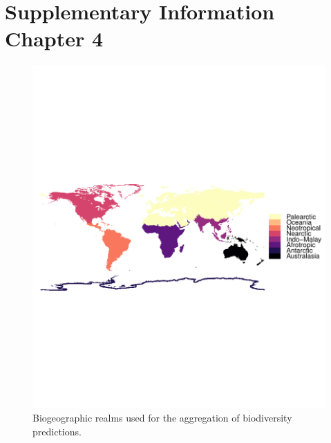 \chapter{Supplementary Information Chapter 4}\label{apx:ch4}

\begin{figure}[htb]
  \centering
    \includegraphics{chapters/figures/chapter4/supfig_ecorealms.pdf} 
    \caption{Biogeographic realms used for the aggregation of biodiversity predictions.}
    \label{ch4:supfig_ecorealms}
\end{figure}

